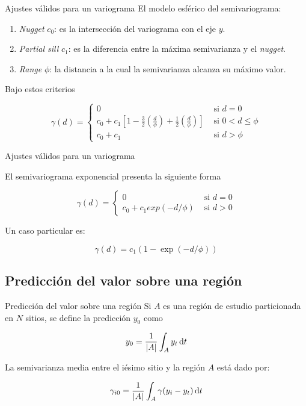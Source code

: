 \documentclass[12pts]{beamer}
\begin{document}
	\begin{frame}{Ajustes válidos para un variograma}
		El modelo esférico del semivariograma:
		
		\begin{enumerate}
			\item \textit{Nugget} $c_0$: es la intersección del variograma con el eje $y$. 
			\item \textit{Partial sill} $c_1$: es la diferencia entre la máxima semivarianza y el \textit{nugget}. 
			\item \textit{Range} $\phi$: la distancia a la cual la semivarianza alcanza su máximo valor.
		\end{enumerate}
		
		Bajo estos criterios
		
		\begin{equation}
		\gamma (d) = \begin{cases}
		0 & \textrm{ si } d = 0 \\
		c_0 + c_1\left[1 - \frac{3}{2}\left(\frac{d}{\phi}\right) + \frac{1}{2} \left(\frac{d}{\phi}\right)\right] & \textrm{ si } 0 < d \leq \phi \\
		c_0 + c_1 & \textrm{ si } d > \phi
		\end{cases}
		\end{equation}
	\end{frame}

	\begin{frame}{Ajustes válidos para un variograma}
				
		El semivariograma exponencial presenta la siguiente forma
		
		\begin{equation}
		\gamma(d) = \begin{cases}
		0 & \textrm{ si } d = 0\\
		c_0 + c_1 exp(-d/\phi) & \textrm{ si } d > 0
		\end{cases}
		\end{equation}
		
		Un caso particular es: 
		
		$$\gamma(d) = c_1(1 - \exp(-d/\phi))$$		
	\end{frame}

	\subsection{Predicción del valor sobre una región}
	\begin{frame}{Predicción del valor sobre una región}
		Si $A$ es una región de estudio  particionada en $N$ sitios, se define la predicción $y_0$ como
		
		\begin{equation}
		y_0 = \frac{1}{\abs{A}} \int_{A} y_t \dd{t}
		\end{equation}
		
		\noindent La semivarianza media entre el iésimo sitio y la región $A$ está dado por:
		
		\begin{equation}
		\gamma_{i0} = \frac{1}{\abs{A}} \int_{A}\gamma(y_i - y_t)\dd{t}
		\end{equation}		
	\end{frame}
\end{document}
